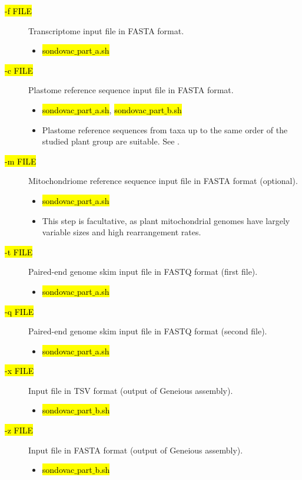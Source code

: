 \documentclass[a4paper, 11pt, twoside]{article}
\renewcommand{\texttt}[1]{\hl{\ttfamily #1}}
\begin{document}
\begin{description}
\item[\texttt{-f FILE}] Transcriptome input file in FASTA format.
  \begin{itemize}
    \item \texttt{sondovac$\_$part$\_$a.sh}
  \end{itemize}
\item[\texttt{-c FILE}] Plastome reference sequence input file in FASTA format.
  \begin{itemize}
    \item \texttt{sondovac$\_$part$\_$a.sh}, \texttt{sondovac$\_$part$\_$b.sh}
    \item Plastome reference sequences from taxa up to the same order of the studied plant group are suitable. See \citet{Straub2012}.
  \end{itemize}
\item[\texttt{-m FILE}] Mitochondriome reference sequence input file in FASTA format (optional).
  \begin{itemize}
    \item \texttt{sondovac$\_$part$\_$a.sh}
    \item This step is facultative, as plant mitochondrial genomes have largely variable sizes and high rearrangement rates.
  \end{itemize}
\item[\texttt{-t FILE}] Paired-end genome skim input file in FASTQ format (first file).
  \begin{itemize}
    \item \texttt{sondovac$\_$part$\_$a.sh}
  \end{itemize}
\item[\texttt{-q FILE}] Paired-end genome skim input file in FASTQ format (second file).
  \begin{itemize}
    \item \texttt{sondovac$\_$part$\_$a.sh}
  \end{itemize}
\item[\texttt{-x FILE}] Input file in TSV format (output of Geneious assembly).
  \begin{itemize}
    \item \texttt{sondovac$\_$part$\_$b.sh}
  \end{itemize}
\item[\texttt{-z FILE}] Input file in FASTA format (output of Geneious assembly).
  \begin{itemize}
    \item \texttt{sondovac$\_$part$\_$b.sh}
  \end{itemize}
\end{description}
\end{document}
